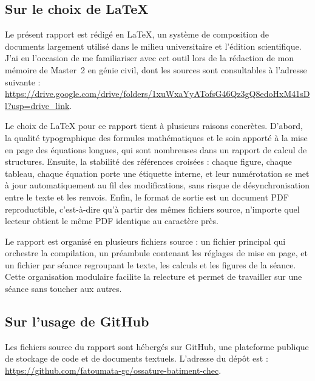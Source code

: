 

\subsection*{Sur le choix de \LaTeX{}}

Le présent rapport est rédigé en \LaTeX{}, un système de composition de
documents largement utilisé dans le milieu universitaire et l'édition
scientifique. J'ai eu l'occasion de me familiariser avec cet outil lors
de la rédaction de mon mémoire de Master~2 en génie civil, dont les
sources sont consultables à l'adresse suivante :
\url{https://drive.google.com/drive/folders/1xuWxaYyATofsG46Qz3gQ8edoHxM41sDl?usp=drive_link}.

Le choix de \LaTeX{} pour ce rapport tient à plusieurs raisons concrètes.
D'abord, la qualité typographique des formules mathématiques et le soin
apporté à la mise en page des équations longues, qui sont nombreuses
dans un rapport de calcul de structures. Ensuite, la stabilité des
références croisées : chaque figure, chaque tableau, chaque équation
porte une étiquette interne, et leur numérotation se met à jour
automatiquement au fil des modifications, sans risque de
désynchronisation entre le texte et les renvois. Enfin, le format de
sortie est un document PDF reproductible, c'est-à-dire qu'à partir des
mêmes fichiers source, n'importe quel lecteur obtient le même PDF
identique au caractère près.

Le rapport est organisé en plusieurs fichiers source : un fichier
principal qui orchestre la compilation, un préambule contenant les
réglages de mise en page, et un fichier par séance regroupant le texte,
les calculs et les figures de la séance. Cette organisation modulaire
facilite la relecture et permet de travailler sur une séance sans
toucher aux autres.

\subsection*{Sur l'usage de GitHub}

Les fichiers source du rapport sont hébergés sur GitHub, une plateforme
publique de stockage de code et de documents textuels. L'adresse du
dépôt est :
\url{https://github.com/fatoumata-gc/ossature-batiment-chec}.

